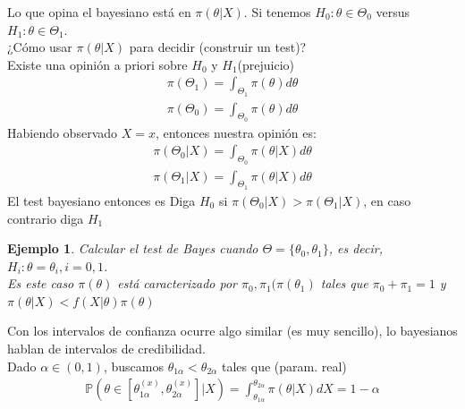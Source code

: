 \documentclass[10pt]{article}
\theoremstyle{plain}
\newtheorem{ej}{Ejemplo}
\theoremstyle{definition}
\begin{document}
\begin{etaremune}
\item Lo que opina el bayesiano está en $\pi(\theta|X)$. Si tenemos $H_{0}:\theta\in \Theta_{0}$ versus $H_{1}:\theta\in \Theta_{1}$.\\
¿Cómo usar $\pi(\theta|X)$ para decidir (construir un test)?\\

Existe una opinión a priori sobre $H_{0}$ y $H_{1}$(prejuicio)
\begin{align*}
\pi(\Theta_{1}) = \int_{\Theta_{1}}\pi(\theta)d\theta\\
\pi(\Theta_{0}) = \int_{\Theta_{0}}\pi(\theta)d\theta
\end{align*}
Habiendo observado $X=x$, entonces nuestra opinión es:
\begin{align*}
\pi(\Theta_{0}|X) = \int_{\Theta_{0}}\pi(\theta|X)d\theta\\
\pi(\Theta_{1}|X) = \int_{\Theta_{1}}\pi(\theta|X)d\theta
\end{align*}
El test bayesiano entonces es Diga $H_{0}$ si $\pi(\Theta_{0}|X) > \pi(\Theta_{1}|X)$, en caso contrario diga $H_{1}$
\begin{ej}
Calcular el test de Bayes cuando $\Theta = \{\theta_{0},\theta_{1}\}$, es decir, $H_{i}: \theta = \theta_{i}, i = 0,1$.\\
Es este caso $\pi(\theta)$ está caracterizado por $\pi_{0},\pi_{1}(\pi(\theta_{1})$ tales que $\pi_{0}+\pi_{1}=1$ y $\pi(\theta|X) < f(X|\theta)\pi(\theta)$
\end{ej}
\item Con los intervalos de confianza ocurre algo similar (es muy sencillo), lo bayesianos hablan de intervalos de credibilidad.\\
Dado $\alpha \in (0,1)$, buscamos $\theta_{1\alpha}<\theta_{2\alpha}$ tales que (param. real)
\begin{align*}
\mathbb{P}(\theta \in [\theta_{1\alpha}^{(x)},\theta_{2\alpha}^{(x)}]|X) = \int_{\theta_{1\alpha}}^{\theta_{2\alpha}}\pi(\theta|X)dX = 1-\alpha
\end{align*}
\begin{center}

\end{center}
\end{etaremune}
\end{document}
